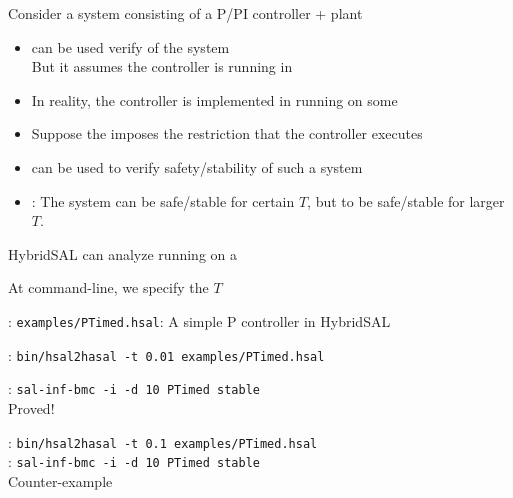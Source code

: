 \documentclass{seminar}
\begin{document}
\begin{slide}

Consider a system consisting of a P/PI controller + plant

\begin{itemize}
\item
 {} can be used verify {} of the system
 \\
 But it assumes the controller is running in {}

\item
 In reality, the controller is implemented in {} running
 on some {}

\item
 Suppose the {} imposes the restriction that the controller
 executes {}

\item
 {} can be used to 
 verify safety/stability of such a system

\item
 {}:  The system can be safe/stable for certain
 $T$, but {} to be safe/stable for larger $T$.

\end{itemize}


\end{slide}
\begin{slide}

HybridSAL can analyze {} running on a 
{}

At command-line, we specify the {} $T$


\bigskip
{}: {\tt{examples/PTimed.hsal}}: A simple P controller in HybridSAL

{}: {\tt{bin/hsal2hasal -t 0.01 examples/PTimed.hsal}}

{}: {\tt{sal-inf-bmc -i -d 10 PTimed stable}} 
\\
Proved!

{}: {\tt{bin/hsal2hasal -t 0.1 examples/PTimed.hsal}}
\\
{}: {\tt{sal-inf-bmc -i -d 10 PTimed stable}} 
\\
Counter-example

\end{slide}
\end{document}
